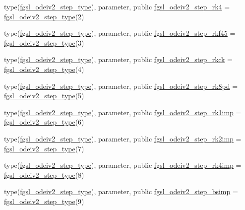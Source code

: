 \begin{DoxyCompactItemize}
\item 
type(\hyperlink{structfgsl_1_1fgsl__odeiv2__step__type}{fgsl\+\_\+odeiv2\+\_\+step\+\_\+type}), parameter, public \hyperlink{namespacefgsl_a3d8617454e04b4450cc8c8f3101ff504}{fgsl\+\_\+odeiv2\+\_\+step\+\_\+rk4} = \hyperlink{structfgsl_1_1fgsl__odeiv2__step__type}{fgsl\+\_\+odeiv2\+\_\+step\+\_\+type}(2)
\item 
type(\hyperlink{structfgsl_1_1fgsl__odeiv2__step__type}{fgsl\+\_\+odeiv2\+\_\+step\+\_\+type}), parameter, public \hyperlink{namespacefgsl_a9ddf77505b3bd58dea1832c7d57cb566}{fgsl\+\_\+odeiv2\+\_\+step\+\_\+rkf45} = \hyperlink{structfgsl_1_1fgsl__odeiv2__step__type}{fgsl\+\_\+odeiv2\+\_\+step\+\_\+type}(3)
\item 
type(\hyperlink{structfgsl_1_1fgsl__odeiv2__step__type}{fgsl\+\_\+odeiv2\+\_\+step\+\_\+type}), parameter, public \hyperlink{namespacefgsl_a18b4edbca94c0c9d60fbadc94d1d4964}{fgsl\+\_\+odeiv2\+\_\+step\+\_\+rkck} = \hyperlink{structfgsl_1_1fgsl__odeiv2__step__type}{fgsl\+\_\+odeiv2\+\_\+step\+\_\+type}(4)
\item 
type(\hyperlink{structfgsl_1_1fgsl__odeiv2__step__type}{fgsl\+\_\+odeiv2\+\_\+step\+\_\+type}), parameter, public \hyperlink{namespacefgsl_aa7c82f7503be3be3ab81991a3e8eb719}{fgsl\+\_\+odeiv2\+\_\+step\+\_\+rk8pd} = \hyperlink{structfgsl_1_1fgsl__odeiv2__step__type}{fgsl\+\_\+odeiv2\+\_\+step\+\_\+type}(5)
\item 
type(\hyperlink{structfgsl_1_1fgsl__odeiv2__step__type}{fgsl\+\_\+odeiv2\+\_\+step\+\_\+type}), parameter, public \hyperlink{namespacefgsl_ae903b3c5e98a84868123fcf7f45cdf11}{fgsl\+\_\+odeiv2\+\_\+step\+\_\+rk1imp} = \hyperlink{structfgsl_1_1fgsl__odeiv2__step__type}{fgsl\+\_\+odeiv2\+\_\+step\+\_\+type}(6)
\item 
type(\hyperlink{structfgsl_1_1fgsl__odeiv2__step__type}{fgsl\+\_\+odeiv2\+\_\+step\+\_\+type}), parameter, public \hyperlink{namespacefgsl_a7b4cc51dc91d507009b26f542f372bbd}{fgsl\+\_\+odeiv2\+\_\+step\+\_\+rk2imp} = \hyperlink{structfgsl_1_1fgsl__odeiv2__step__type}{fgsl\+\_\+odeiv2\+\_\+step\+\_\+type}(7)
\item 
type(\hyperlink{structfgsl_1_1fgsl__odeiv2__step__type}{fgsl\+\_\+odeiv2\+\_\+step\+\_\+type}), parameter, public \hyperlink{namespacefgsl_ac791c6691e1ebeae5e10c234a26737df}{fgsl\+\_\+odeiv2\+\_\+step\+\_\+rk4imp} = \hyperlink{structfgsl_1_1fgsl__odeiv2__step__type}{fgsl\+\_\+odeiv2\+\_\+step\+\_\+type}(8)
\item 
type(\hyperlink{structfgsl_1_1fgsl__odeiv2__step__type}{fgsl\+\_\+odeiv2\+\_\+step\+\_\+type}), parameter, public \hyperlink{namespacefgsl_a6c2cfecdf8c9901ed22feb4c9fdef384}{fgsl\+\_\+odeiv2\+\_\+step\+\_\+bsimp} = \hyperlink{structfgsl_1_1fgsl__odeiv2__step__type}{fgsl\+\_\+odeiv2\+\_\+step\+\_\+type}(9)

\end{DoxyCompactItemize}
